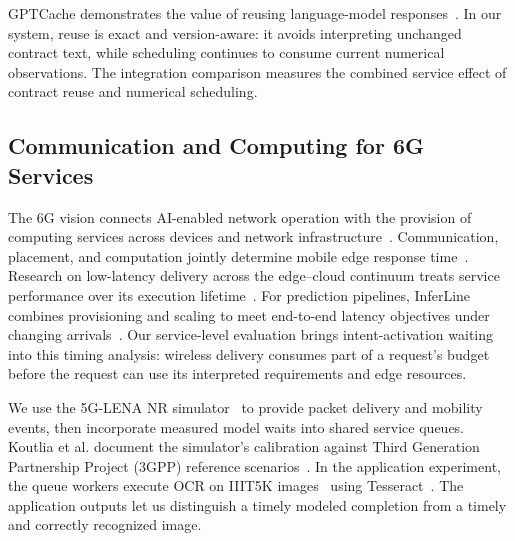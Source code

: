 GPTCache demonstrates the value of reusing language-model responses~\cite{bang2023gptcache}. In our system, reuse is exact and version-aware: it avoids interpreting unchanged contract text, while scheduling continues to consume current numerical observations. The integration comparison measures the combined service effect of contract reuse and numerical scheduling.

\subsection{Communication and Computing for 6G Services}
The 6G vision connects AI-enabled network operation with the provision of computing services across devices and network infrastructure~\cite{letaief2019roadmap,itu2023imt}. Communication, placement, and computation jointly determine mobile edge response time~\cite{mao2017survey}. Research on low-latency delivery across the edge--cloud continuum treats service performance over its execution lifetime~\cite{santos2021lowlatency}. For prediction pipelines, InferLine combines provisioning and scaling to meet end-to-end latency objectives under changing arrivals~\cite{crankshaw2020inferline}. Our service-level evaluation brings intent-activation waiting into this timing analysis: wireless delivery consumes part of a request's budget before the request can use its interpreted requirements and edge resources.

We use the 5G-LENA NR simulator~\cite{patriciello2019nr} to provide packet delivery and mobility events, then incorporate measured model waits into shared service queues. Koutlia et al. document the simulator's calibration against Third Generation Partnership Project (3GPP) reference scenarios~\cite{koutlia2022calibration}. In the application experiment, the queue workers execute OCR on IIIT5K images~\cite{mishra2012scene} using Tesseract~\cite{smith2007overview}. The application outputs let us distinguish a timely modeled completion from a timely and correctly recognized image.

